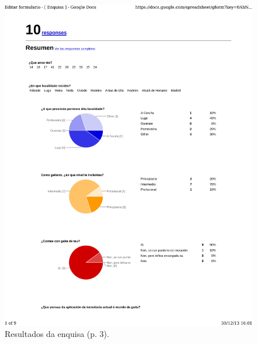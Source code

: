\begin{figure}
 \centering
 \includegraphics[scale=0.7,page=3,keepaspectratio=true,clip,trim=0cm 22cm 0cm 0.5cm]{./imagenes/enquisa.pdf}
 \caption{Resultados da enquisa (p. 3).}
 \label{figura:ResultadosEnquisa3}
\end{figure}

